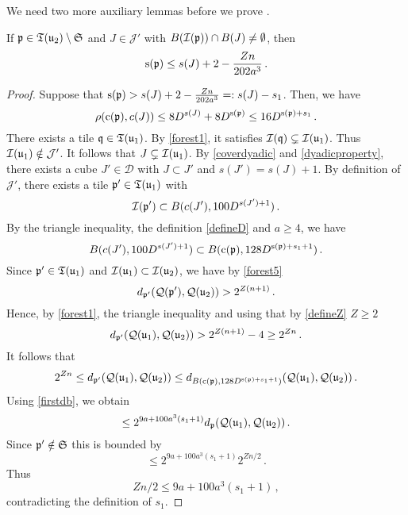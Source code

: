     We need two more auxiliary lemmas before we prove .

    \begin{lemma}
        \label{thin-scale-impact}
        \leanok
        If ${\mathfrak p} \in {\mathfrak T}({\mathfrak u}_2) \setminus \mathfrak{S}$ and $J \in \mathcal{J'}$ with $B({\mathcal{I}}({\mathfrak p})) \cap B(J) \ne \emptyset$, then
        $$
            {\mathrm{s}}({\mathfrak p}) \le s(J) + 2 - \frac{Zn}{202a^3}\,.
        $$
    \end{lemma}

    \begin{proof}
        Suppose that ${\mathrm{s}}({\mathfrak p}) > s(J) + 2 -\frac{Zn}{202a^3} =: s(J) - s_1$. Then, we have
        $$
            \rho({\mathrm{c}}({\mathfrak p}), c(J)) \le 8D^{s(J)}+8D^{{\mathrm{s}}({\mathfrak p})} \le 16 D^{{\mathrm{s}}({\mathfrak p}) + s_1}\,.
        $$
        There exists a tile ${\mathfrak q} \in {\mathfrak T}({\mathfrak u}_1)$. By \eqref{forest1}, it satisfies ${\mathcal{I}}({\mathfrak q}) \subsetneq {\mathcal{I}}({\mathfrak u}_1)$. Thus ${\mathcal{I}}({\mathfrak u}_1) \notin \mathcal{J}'$. It follows that $J \subsetneq {\mathcal{I}}({\mathfrak u}_1)$. By \eqref{coverdyadic} and \eqref{dyadicproperty}, there exists a cube $J' \in \mathcal{D}$ with $J \subset J'$ and $s(J') = s(J) + 1$. By definition of $\mathcal{J}'$, there exists a tile ${\mathfrak p}' \in {\mathfrak T}({\mathfrak u}_1)$ with
        $$
            {\mathcal{I}}({\mathfrak p}') \subset B(c(J'), 100 D^{s(J') + 1})\,.
        $$
        By the triangle inequality, the definition \eqref{defineD} and $a \ge 4$, we have
        $$
            B(c(J'), 100 D^{s(J')+1}) \subset B({\mathrm{c}}({\mathfrak p}), 128 D^{{\mathrm{s}}({\mathfrak p}) + s_1 + 1})\,.
        $$
        Since ${\mathfrak p}' \in {\mathfrak T}({\mathfrak u}_1)$ and ${\mathcal{I}}({\mathfrak u}_1) \subset {\mathcal{I}}({\mathfrak u}_2)$, we have by \eqref{forest5}
        $$
            d_{{\mathfrak p}'}({\mathcal{Q}}({\mathfrak p}'), {\mathcal{Q}}({\mathfrak u}_2)) > 2^{Z(n+1)}\,.
        $$
        Hence, by \eqref{forest1}, the triangle inequality and using that by \eqref{defineZ} $Z \ge 2$
        $$
            d_{{\mathfrak p}'}({\mathcal{Q}}({\mathfrak u}_1), {\mathcal{Q}}({\mathfrak u}_2)) > 2^{Z(n+1)} - 4 \ge 2^{Zn}\,.
        $$
        It follows that
        $$
            2^{Zn} \le d_{{\mathfrak p}'}({\mathcal{Q}}({\mathfrak u}_1), {\mathcal{Q}}({\mathfrak u}_2)) \le d_{B({\mathrm{c}}({\mathfrak p}), 128 D^{{\mathrm{s}}({\mathfrak p}) + s_1+ 1})}({\mathcal{Q}}({\mathfrak u}_1), {\mathcal{Q}}({\mathfrak u}_2))\,.
        $$
        Using \eqref{firstdb}, we obtain
        $$
            \le 2^{9a + 100a^3 (s_1+1)} d_{{\mathfrak p}}({\mathcal{Q}}({\mathfrak u}_1), {\mathcal{Q}}({\mathfrak u}_2))\,.
        $$
        Since ${\mathfrak p}' \notin \mathfrak{S}$ this is bounded by
        $$
            \le 2^{9a + 100a^3 (s_1+1)} 2^{Zn/2}\,.
        $$
        Thus
        $$
            Z n/2 \le 9a + 100a^3(s_1 + 1)\,,
        $$
        contradicting the definition of $s_1$.
    \end{proof}

